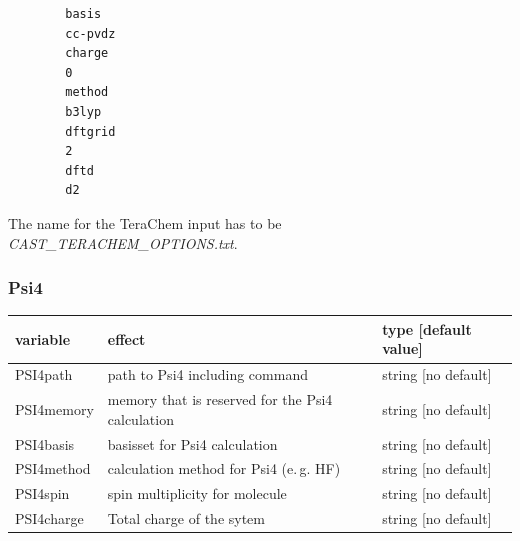 \documentclass[10pt,a4paper]{article} %
\begin{document}
		\begin{lstlisting}
		basis
		cc-pvdz
		charge
		0
		method
		b3lyp
		dftgrid
		2
		dftd
		d2\end{lstlisting}

		The name for the TeraChem input has to be \glqq \textit{CAST\_TERACHEM\_OPTIONS.txt}\grqq.
		
		\subsubsection{Psi4}
		
			\begin{longtable}{|p{3.5cm}|p{5cm}|p{3cm}|}
		variable & effect & type [default value] \\
		\hline
			PSI4path  & path to Psi4 including command & string [no default]\\
			PSI4memory  & memory that is reserved for the Psi4 calculation & string [no default]\\
			PSI4basis & basisset for Psi4 calculation & string [no default]\\
			PSI4method & calculation method for Psi4 (e.\,g. HF) &  string [no default]\\
      PSI4spin & spin multiplicity for molecule & string [no default]\\
			PSI4charge   & Total charge of the sytem &string [no default] \\
		\end{longtable}~\\
			
\end{document}
